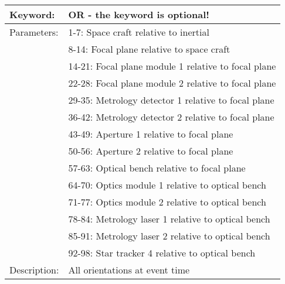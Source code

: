 \begin{table}[htdp]
\begin{center}
\begin{tabular}{|p{2cm}|p{12cm}|}
\hline
Keyword:&	OR - the keyword is optional!\\
\hline
Parameters:&	1-7:  Space craft relative to inertial\\
&8-14: Focal plane relative to space craft \\
&14-21: Focal plane module 1 relative to focal plane\\
&22-28: Focal plane module 2 relative to focal plane\\
&29-35: Metrology detector 1 relative to focal plane\\
&36-42: Metrology detector 2 relative to focal plane\\
&43-49: Aperture 1 relative to focal plane\\
&50-56: Aperture 2 relative to focal plane\\
&57-63: Optical bench relative to focal plane\\
&64-70: Optics module 1 relative to optical bench\\
&71-77: Optics module 2 relative to optical bench\\
&78-84: Metrology laser 1 relative to optical bench\\
&85-91: Metrology laser 2 relative to optical bench\\
&92-98: Star tracker 4 relative to optical bench \\
\hline
Description:&	All orientations at event time\\
\hline
\end{tabular}
\end{center}
\end{table}
